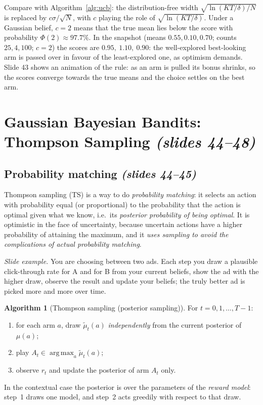 \documentclass[11pt,a4paper]{article}
\DeclareMathOperator*{\argmax}{arg\,max}
\newcommand{\slides}[1]{\emph{(slides #1)}}
\theoremstyle{plain}
\theoremstyle{definition}
\newtheorem{algorithm}[theorem]{Algorithm}
\theoremstyle{remark}
\begin{document}
\begin{intuition}
Compare with Algorithm~\ref{alg:ucb}: the distribution-free width $\sqrt{\ln(KT/\delta)/N}$ is replaced by $c\sigma/\sqrt N$, with $c$ playing the role of $\sqrt{\ln(KT/\delta)}$. Under a Gaussian belief, $c=2$ means that the true mean lies below the score with probability
$\Phi(2)\approx97.7\%$. In the snapshot (means $0.55,0.10,0.70$; counts $25,4,100$; $c=2$) the scores are $0.95,\ 1.10,\ 0.90$: the well-explored best-looking arm is passed over in favour of the least-explored one, as optimism demands.
Slide 43 shows an animation of the rule: as an arm is pulled its bonus shrinks, so the scores converge towards the true means and the choice settles on the best arm.
\end{intuition}
\section{Gaussian Bayesian Bandits: Thompson Sampling \slides{44--48}}

\subsection{Probability matching \slides{44--45}}

Thompson sampling (TS) is a way to do \emph{probability matching}: it selects an action with probability equal (or proportional) to the probability that the action is optimal given what we know, i.e.\ its \emph{posterior probability of being optimal}.
It is optimistic in the face of uncertainty, because uncertain actions have a higher probability of attaining the maximum, and it \emph{uses sampling to avoid the complications of actual probability matching}.

\emph{Slide example.} You are choosing between two ads. Each step you draw a plausible click-through rate for A and for B from your current beliefs, show the ad with the higher draw, observe the result and update your beliefs; the truly better ad is picked more and more over time.

\begin{algorithm}[Thompson sampling (posterior sampling)]\label{alg:ts}
For $t=0,1,\dots,T-1$:
\begin{enumerate}
 \item for each arm $a$, draw $\tilde\mu_t(a)$ \emph{independently} from the current posterior of $\mu(a)$;
 \item play $A_t\in\argmax_a\tilde\mu_t(a)$;
 \item observe $r_t$ and update the posterior of arm $A_t$ only.
\end{enumerate}
In the contextual case the posterior is over the parameters of the \emph{reward model}: step~1 draws one model, and step~2 acts greedily with respect to that draw.
\end{algorithm}
\end{document}
